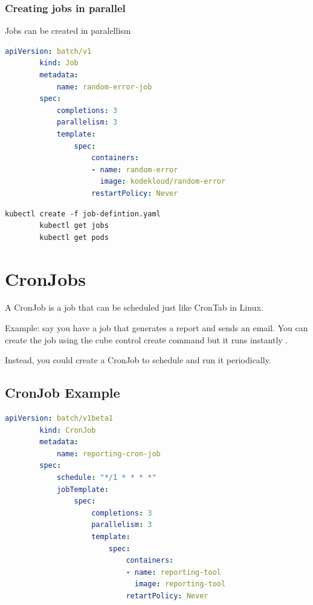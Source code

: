 \documentclass[11pt]{book}
\begin{document}
\subsubsection{Creating jobs in parallel}
    Jobs can be created in paralellism
    \begin{lstlisting}[language=yaml, caption={Job definition file}]
        apiVersion: batch/v1
        kind: Job
        metadata:
            name: random-error-job
        spec:
            completions: 3
            parallelism: 3
            template:
                spec:
                    containers:
                    - name: random-error
                      image: kodekloud/random-error
                    restartPolicy: Never
    \end{lstlisting}

    \begin{lstlisting}[language=terminal, caption={Sumnmary of commands}]
        kubectl create -f job-defintion.yaml
        kubectl get jobs
        kubectl get pods
    \end{lstlisting}


    \section{CronJobs}
    A CronJob is a job that can be scheduled just like CronTab in Linux.

    Example: say you have a job that generates a report and sends an email. You can create the job using the cube control create command but it runs instantly .

    Instead, you could create a CronJob to schedule and run it periodically.

    \subsection{CronJob Example}

    \begin{lstlisting}[language=yaml, caption={Job definition file}]
        apiVersion: batch/v1beta1
        kind: CronJob
        metadata:
            name: reporting-cron-job
        spec:
            schedule: "*/1 * * * *"
            jobTemplate:
                spec:
                    completions: 3
                    parallelism: 3
                    template:
                        spec:
                            containers:
                            - name: reporting-tool
                              image: reporting-tool
                            retartPolicy: Never
    \end{lstlisting}
\end{document}
